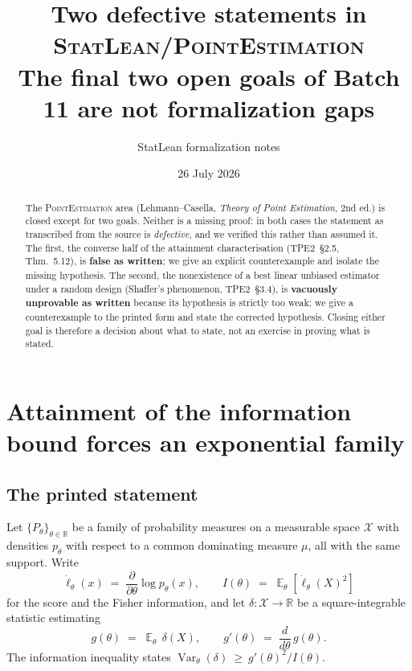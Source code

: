 \documentclass[11pt]{article}
\title{Two defective statements in \textsc{StatLean/PointEstimation}\\
\large The final two open goals of Batch 11 are not formalization gaps}
\author{StatLean formalization notes}
\date{26 July 2026}
\theoremstyle{plain}
\theoremstyle{definition}
\theoremstyle{remark}
\DeclareMathOperator{\Var}{Var}
\DeclareMathOperator{\E}{\mathbb{E}}
\newcommand{\R}{\mathbb{R}}
\newcommand{\X}{\mathcal{X}}
\newcommand{\Pt}{P_\theta}
\newcommand{\score}{\dot\ell_\theta}
\begin{document}
\maketitle

\begin{abstract}
The \textsc{PointEstimation} area (Lehmann--Casella, \emph{Theory of Point Estimation},
2nd ed.) is closed except for two goals. Neither is a missing proof: in both cases the
statement as transcribed from the source is \emph{defective}, and we verified this rather
than assumed it. The first, the converse half of the attainment characterisation
(TPE2~\S2.5, Thm.~5.12), is \textbf{false as written}; we give an explicit counterexample
and isolate the missing hypothesis. The second, the nonexistence of a best linear unbiased
estimator under a random design (Shaffer's phenomenon, TPE2~\S3.4), is \textbf{vacuously
unprovable as written} because its hypothesis is strictly too weak; we give a
counterexample to the printed form and state the corrected hypothesis. Closing either
goal is therefore a decision about what to state, not an exercise in proving what is
stated.
\end{abstract}

\section{Attainment of the information bound forces an exponential family}

\subsection{The printed statement}

Let $\{\Pt\}_{\theta\in\R}$ be a family of probability measures on a measurable space
$\X$ with densities $p_\theta$ with respect to a common dominating measure $\mu$, all with
the same support. Write
\[
  \score(x) \;=\; \frac{\partial}{\partial\theta}\log p_\theta(x),
  \qquad
  I(\theta) \;=\; \E_\theta\!\left[\score(X)^2\right]
\]
for the score and the Fisher information, and let $\delta:\X\to\R$ be a square-integrable
statistic estimating
\[
  g(\theta) \;=\; \E_\theta\,\delta(X), \qquad g'(\theta) \;=\; \frac{d}{d\theta}\,g(\theta).
\]
The information inequality states $\Var_\theta(\delta)\ \ge\ g'(\theta)^2/I(\theta)$.
\end{document}
